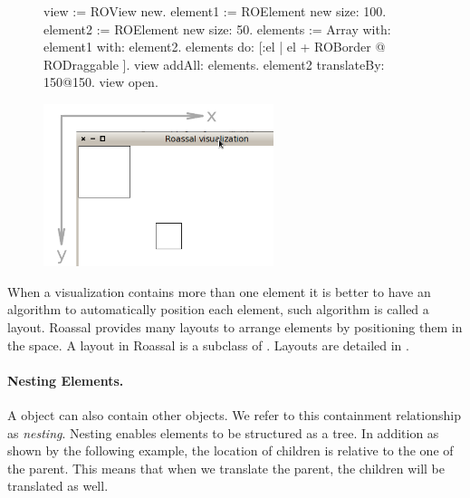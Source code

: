 \documentclass[a4paper,10pt,twoside]{book}
\begin{document}
\begin{figure}[H]
      \begin{minipage}[t]{0.5\textwidth}
      \vspace{0pt}
\begin{code}{}
view := ROView new.
element1 := ROElement new size: 100.
element2 := ROElement new size: 50.
elements := Array with: element1 with: element2.
elements do: [:el | el + ROBorder @ RODraggable ].
view addAll: elements.
element2 translateBy: 150@150.
view open.
\end{code}
   \end{minipage}
   \hfill
   \begin{minipage}[t]{0.6\textwidth}
      \vspace{0pt} \raggedright
       \centering
		\includegraphics[width=0.6\textwidth]{ex4}
   \end{minipage}
\label{fig:ex4}
\end{figure}


When a visualization contains more than one element it is better to have an algorithm to automatically position each element, such algorithm is called a layout. Roassal provides many layouts to arrange elements by positioning them in the space. A layout in Roassal is a subclass of . Layouts are detailed in .

\paragraph{Nesting Elements.}
A  object can also contain other  objects. We refer to this containment relationship as \emph{nesting}. Nesting enables elements to be structured as a tree. In addition as shown by the following example, the location of children is relative to the one of the parent. This means that when we translate the parent, the children will be translated as well. %
\end{document}
